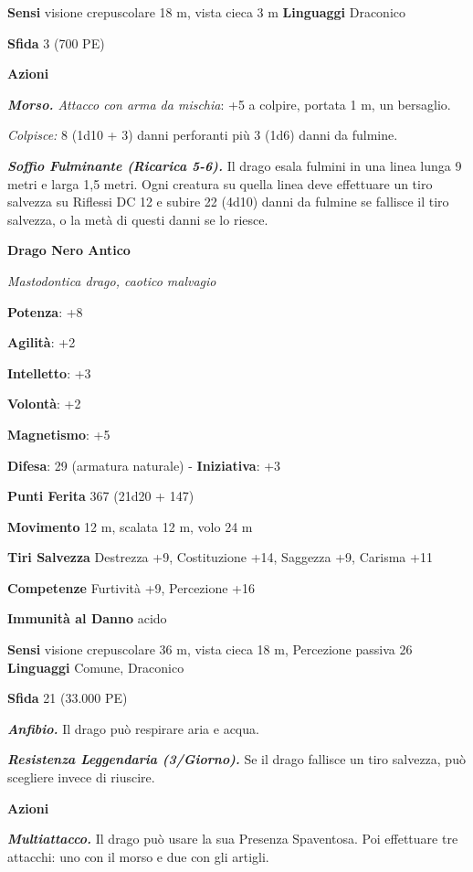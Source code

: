 \begin{multicols}{2}
\textbf{Sensi} visione crepuscolare 18 m, vista cieca 3 m
\textbf{Linguaggi} Draconico

\textbf{Sfida} 3 (700 PE)\smallskip

\smallskip\textbf{Azioni}

\emph{\textbf{Morso.} Attacco con arma da mischia}: +5 a colpire,
portata 1 m, un bersaglio.

\emph{Colpisce:} 8 (1d10 + 3) danni perforanti più 3 (1d6) danni da
fulmine.

\emph{\textbf{Soffio Fulminante (Ricarica 5-6).}} Il drago esala fulmini
in una linea lunga 9 metri e larga 1,5 metri. Ogni creatura su quella
linea deve effettuare un tiro salvezza su Riflessi DC 12 e subire 22
(4d10) danni da fulmine se fallisce il tiro salvezza, o la metà di
questi danni se lo riesce.

\textbf{Drago Nero Antico}

\emph{Mastodontica drago, caotico malvagio}

\textbf{Potenza}: +8

\textbf{Agilità}: +2

\textbf{Intelletto}: +3

\textbf{Volontà}: +2

\textbf{Magnetismo}: +5

\textbf{Difesa}: 29 (armatura naturale) - \textbf{Iniziativa}: +3

\textbf{Punti Ferita} 367 (21d20 + 147)

\textbf{Movimento} 12 m, scalata 12 m, volo 24 m

\textbf{Tiri Salvezza} Destrezza +9, Costituzione +14, Saggezza +9,
Carisma +11

\textbf{Competenze} Furtività +9, Percezione +16

\textbf{Immunità al Danno} acido

\textbf{Sensi} visione crepuscolare 36 m, vista cieca 18 m, Percezione passiva
26 \textbf{Linguaggi} Comune, Draconico

\textbf{Sfida} 21 (33.000 PE)\smallskip

\emph{\textbf{Anfibio.}} Il drago può respirare aria e acqua.

\emph{\textbf{Resistenza Leggendaria (3/Giorno).}} Se il drago fallisce
un tiro salvezza, può scegliere invece di riuscire.

\smallskip\textbf{Azioni}

\emph{\textbf{Multiattacco.}} Il drago può usare la sua Presenza
Spaventosa. Poi effettuare tre attacchi: uno con il morso e due con gli
artigli.


\end{multicols}
